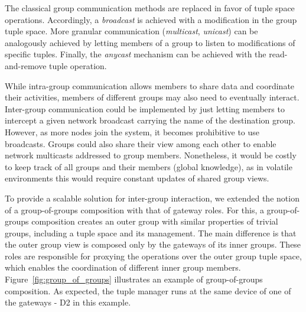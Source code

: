 

The classical group communication methods are replaced in favor of tuple space operations. Accordingly, a \textit{broadcast} is achieved with a modification in the group tuple space. More granular communication (\textit{multicast}, \textit{unicast}) can be analogously achieved by letting members of a group to listen to modifications of specific tuples. Finally, the \textit{anycast} mechanism can be achieved with the read-and-remove tuple operation. 




While intra-group communication allows members to share data and coordinate their activities, members of different groups may also need to eventually interact. Inter-group communication could be implemented by just letting members to intercept a given network broadcast carrying the name of the destination group. However, as more nodes join the system, it becomes prohibitive to use broadcasts. Groups could also share their view among each other to enable network multicasts addressed to group members. Nonetheless, it would be costly to keep track of all groups and their members (global knowledge), as in volatile environments this would require constant updates of shared group views.

To provide a scalable solution for inter-group interaction, we extended the notion of a group-of-groups composition with that of gateway roles. For this, a group-of-groups composition creates an outer group with similar properties of trivial groups, including a tuple space and its management. The main difference is that the outer group view is composed only by the gateways of its inner groups. These roles are responsible for proxying the operations over the  outer group tuple space, which enables the coordination of different inner group members. Figure~\ref{fig:group_of_groups} illustrates an example of group-of-groups composition. As expected, the tuple manager runs at the same device of one of the gateways - D2 in this example.

